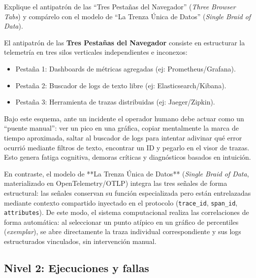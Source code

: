\documentclass[variant=guia,cover=institutional,mode=screen]{ua-engineering-v6-article}
\begin{document}
\begin{uaexercise}
Explique el antipatrón de las ``Tres Pestañas del Navegador'' (\emph{Three Browser Tabs}) y compárelo con el modelo de ``La Trenza Única de Datos'' (\emph{Single Braid of Data}).
\end{uaexercise}
\begin{uaanswer}
El antipatrón de las \textbf{Tres Pestañas del Navegador} consiste en estructurar la telemetría en tres silos verticales independientes e inconexos:
\begin{itemize}
\item Pestaña 1: Dashboards de métricas agregadas (ej: Prometheus/Grafana).
\item Pestaña 2: Buscador de logs de texto libre (ej: Elasticsearch/Kibana).
\item Pestaña 3: Herramienta de trazas distribuidas (ej: Jaeger/Zipkin).
\end{itemize}
Bajo este esquema, ante un incidente el operador humano debe actuar como un ``puente manual'': ver un pico en una gráfica, copiar mentalmente la marca de tiempo aproximada, saltar al buscador de logs para intentar adivinar qué error ocurrió mediante filtros de texto, encontrar un ID y pegarlo en el visor de trazas. Esto genera fatiga cognitiva, demoras críticas y diagnósticos basados en intuición.

En contraste, el modelo de **La Trenza Única de Datos** (\emph{Single Braid of Data}, materializado en OpenTelemetry/OTLP) integra las tres señales de forma estructural: las señales conservan su función especializada pero están entrelazadas mediante contexto compartido inyectado en el protocolo (\texttt{trace\_id}, \texttt{span\_id}, \texttt{attributes}). De este modo, el sistema computacional realiza las correlaciones de forma automática: al seleccionar un punto atípico en un gráfico de percentiles (\emph{exemplar}), se abre directamente la traza individual correspondiente y sus logs estructurados vinculados, sin intervención manual.
\end{uaanswer}

\subsection*{Nivel 2: Ejecuciones y fallas}
\end{document}
